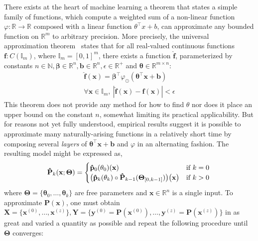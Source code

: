 \documentclass[12pt,initial,twoside,maitrise]{dms}
\numberwithin{equation}{section}
\numberwithin{table}{chapter}
\numberwithin{figure}{chapter}
\begin{document}
There exists at the heart of machine learning a theorem that states a simple family of functions, which compute a weighted sum of a non-linear function $\varphi: \mathbb{R} \rightarrow \mathbb{R}$ composed with a linear function $\theta^\intercal x + b$, can approximate any bounded function on $\mathbb{R}^m$ to arbitrary precision. More precisely, the universal approximation theorem~\citep{hornik1989multilayer} states that for all real-valued continuous functions $\mathbf{f}: C(\mathbb{I}_m)$, where $\mathbb{I}_m = [0, 1]^m$, there exists a function $\mathbf{\hat f}$, parameterized by constants $n \in \mathbb{N}, \mathbf{\beta} \in \mathbb{R}^n, \mathbf{b} \in \mathbb{R}^n, \epsilon \in \mathbb{R}^+$ and $\mathbf{\theta} \in \mathbb{R}^{m \times n}$:
%
\begin{equation}
    \begin{split}
        \mathbf{\hat{f}}(\mathbf{x}) = \mathbf{\beta}^\intercal \varphi_{\odot} \left(\mathbf{\theta}^\intercal \mathbf{x} + \mathbf{b}\right) \\
        \forall \mathbf{x} \in \mathbb{I}_m, \ | \mathbf{\hat f}( \mathbf{x} ) - \mathbf{f} ( \mathbf{x} ) | < \epsilon
    \end{split}
\end{equation}
%
This theorem does not provide any method for how to find $\theta$ nor does it place an upper bound on the constant $n$, somewhat limiting its practical applicability. But for reasons not yet fully understood, empirical results suggest it is possible to approximate many naturally-arising functions in a relatively short time by composing several \textit{layers} of $\mathbf{\theta}^\intercal \mathbf{x} + \mathbf{b}$ and $\varphi$ in an alternating fashion. The resulting model might be expressed as,
%
\begin{equation} \label{eq:recursive_parametric_eq}
    \mathbf{\hat P}_k(\mathbf{x}; \mathbf{\Theta}) = \begin{cases} \mathbf{\hat p}_0(\mathbf\theta_0)(\mathbf{x}) &\text{if } k=0\\ \big(\mathbf{\hat p}_k(\mathbf\theta_k)\circ \mathbf{\hat P}_{k-1}(\mathbf{\Theta}_{[0, k-1]})\big)\big(\mathbf{x}\big)&\text{if } k > 0 \end{cases} \\
\end{equation}
%
where $\mathbf\Theta = \{\mathbf\theta_0, \dots, \mathbf\theta_k\}$ are free parameters and $\mathbf{x} \in \mathbb{R}^n$ is a single input. To approximate $\mathbf{P}(\mathbf x)$, one must obtain $\mathbf{X} = \{\mathbf{x}^{(0)}, \dots, \mathbf{x}^{(z)}\}, \mathbf{Y} = \{\mathbf{y}^{(0)} = \mathbf{P}(\mathbf{x}^{(0)}), \dots, \mathbf{y}^{(z)} = \mathbf{P}(\mathbf{x}^{(z)})\}$ in as great and varied a quantity as possible and repeat the following procedure until $\mathbf\Theta$ converges:
\end{document}
